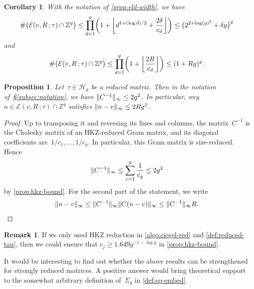 \documentclass[12pt,oneside]{amsart}
\numberwithin{equation}{section}
\newtheorem{prop}[equation]{Proposition}
\newtheorem{cor}[equation]{Corollary}
\theoremstyle{definition}
\newtheorem{rem}[equation]{Remark}
\newcommand{\Z}{\mathbb{Z}}
\newcommand{\Half}{\mathcal{H}}
\newcommand{\eld}[3]{\ensuremath{\mathcal{E}(#1, #2\,; #3)}}
\DeclarePairedDelimiter{\paren}{(}{)}
\DeclarePairedDelimiter{\norm}{\|}{\|}
\DeclarePairedDelimiter{\floor}{\lfloor}{\rfloor}
\begin{document}
\begin{cor}
  \label{cor:eld-nb-pts}
  With the notation of \cref{prop:eld-width}, we have
  \begin{displaymath}
    \# \paren[\big]{\eld{v}{R}{\tau}\cap\Z^g} \leq \prod_{d=1}^g \paren[\bigg]{1 + \floor[\bigg]{d^{1 + (\log d)/2} + \frac{2\delta}{c_d}}}
    \leq \paren[\big]{ 2^{2 + \log(g)^2} + \delta g}^g
  \end{displaymath}
  and
  \begin{displaymath}
    \# \paren[\big]{\eld{v}{R}{\tau}\cap\Z^g} \leq \prod_{d=1}^g \paren[\bigg]{1 + \floor[\bigg]{\frac{2R}{c_d}}} \leq (1 + Rg)^g.
  \end{displaymath}
\end{cor}

\begin{prop}
  \label{prop:eld-width-2}
  Let~$\tau\in \Half_g$ be a reduced matrix. Then in the notation
  of~§\ref{subsec:notation}, we have $\norm{C^{-1}}_\infty \leq 2g^2$. In
  particular, any $n\in \eld{v}{R}{\tau}\cap\Z^g$ satisfies
  $\norm{n - v}_\infty\leq 2 R g^2$.
\end{prop}

\begin{proof}
  Up to transposing it and reversing its lines and columns, the matrix~$C^{-1}$
  is the Cholesky matrix of an HKZ-reduced Gram matrix, and its diagonal
  coefficients are~$1/c_1,\ldots, 1/c_g$. In particular, this Gram matrix is
  size-reduced. Hence
  \begin{displaymath}
    \norm{C^{-1}}_\infty \leq \sum_{j=1}^g \frac{1}{c_g} \leq 2g^2
  \end{displaymath}
  by \cref{prop:hkz-bound}. For the second part of the statement, we write
  \begin{displaymath}
    \norm{n - v}_\infty \leq \norm{C^{-1}}_\infty \norm{C (n-v)}_\infty \leq \norm{C^{-1}}_\infty R. \qedhere
  \end{displaymath}
\end{proof}



\begin{rem}
  If we only used HKZ reduction in \cref{algo:siegel-red} and
  \cref{def:reduced-tau}, then we could ensure that
  $c_j\geq 1.649 g^{-1-\log g}$ in \cref{prop:hkz-bound}.

  It would be interesting to find out whether the above results can be
  strengthened for strongly reduced matrices. A positive answer would bring
  theoretical support to the somewhat arbitrary definition of~$\Sigma_g$ in
  \cref{def:sp-embed}.
\end{rem}
\end{document}
